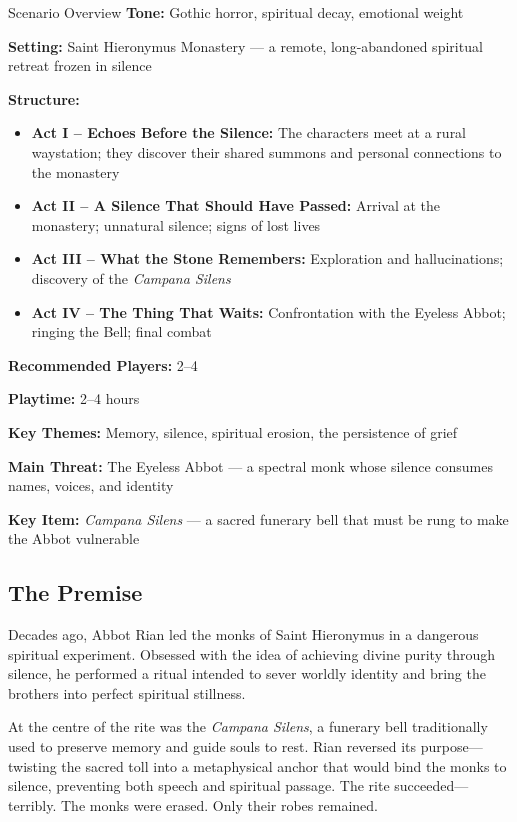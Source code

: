 \begin{CommentBox}{Scenario Overview}
    \textbf{Tone:} Gothic horror, spiritual decay, emotional weight
    
    \noindent
    \textbf{Setting:} Saint Hieronymus Monastery — a remote, long-abandoned spiritual retreat frozen in silence
    
    \noindent
    \textbf{Structure:}
    \begin{itemize}
        \item \textbf{Act I – Echoes Before the Silence:} The characters meet at a rural waystation; they discover their shared summons and personal connections to the monastery
        \item \textbf{Act II – A Silence That Should Have Passed:} Arrival at the monastery; unnatural silence; signs of lost lives
        \item \textbf{Act III – What the Stone Remembers:} Exploration and hallucinations; discovery of the \emph{Campana Silens}
        \item \textbf{Act IV – The Thing That Waits:} Confrontation with the Eyeless Abbot; ringing the Bell; final combat
    \end{itemize}
    
    \noindent
    \textbf{Recommended Players:} 2–4
    
    \noindent
    \textbf{Playtime:} 2–4 hours
    
    \noindent
    \textbf{Key Themes:} Memory, silence, spiritual erosion, the persistence of grief
    
    \noindent
    \textbf{Main Threat:} The Eyeless Abbot — a spectral monk whose silence consumes names, voices, and identity
    
    \noindent
    \textbf{Key Item:} \emph{Campana Silens} — a sacred funerary bell that must be rung to make the Abbot vulnerable
\end{CommentBox}
    


\subsection*{The Premise}
Decades ago, Abbot Rian led the monks of Saint Hieronymus in a dangerous spiritual experiment. Obsessed with the idea of achieving divine purity through silence, he performed a ritual intended to sever worldly identity and bring the brothers into perfect spiritual stillness.

At the centre of the rite was the \emph{Campana Silens}, a funerary bell traditionally used to preserve memory and guide souls to rest. Rian reversed its purpose—twisting the sacred toll into a metaphysical anchor that would bind the monks to silence, preventing both speech and spiritual passage. The rite succeeded—terribly. The monks were erased. Only their robes remained.


